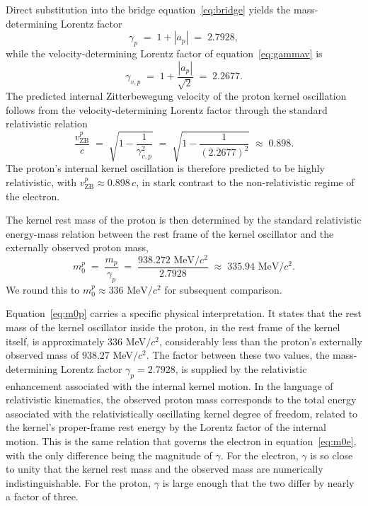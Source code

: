 \documentclass[%
 reprint, amsmath,amssymb, aps, prc, ]{revtex4-2}
\numberwithin{equation}{section}
\newcommand{\vZB}{v_{\text{ZB}}}
\begin{document}
Direct substitution into the bridge equation~\eqref{eq:bridge} yields the mass-determining Lorentz factor
\begin{equation}
\gamma_p \;=\; 1 + |a_p| \;=\; 2.7928,
\label{eq:gammap}
\end{equation}
while the velocity-determining Lorentz factor of equation~\eqref{eq:gammav} is
\begin{equation}
\gamma_{v,p} \;=\; 1 + \frac{|a_p|}{\sqrt{2}} \;=\; 2.2677.
\label{eq:gammavp}
\end{equation}
The predicted internal Zitterbewegung velocity of the proton kernel oscillation follows from the velocity-determining Lorentz factor through the standard relativistic relation
\begin{equation}
\frac{\vZB^p}{c} \;=\; \sqrt{1 - \frac{1}{\gamma_{v,p}^{2}}} \;=\; \sqrt{1 - \frac{1}{(2.2677)^2}} \;\approx\; 0.898.
\label{eq:vZBp}
\end{equation}
The proton's internal kernel oscillation is therefore predicted to be highly relativistic, with $\vZB^p \approx 0.898\,c$, in stark contrast to the non-relativistic regime of the electron.

The kernel rest mass of the proton is then determined by the standard relativistic energy-mass relation between the rest frame of the kernel oscillator and the externally observed proton mass,
\begin{equation}
m_{0}^{p} \;=\; \frac{m_p}{\gamma_p} \;=\; \frac{938.272 \text{ MeV}/c^2}{2.7928} \;\approx\; 335.94 \text{ MeV}/c^2.
\label{eq:m0p}
\end{equation}
We round this to $m_0^p \approx 336 \text{ MeV}/c^2$ for subsequent comparison.

Equation~\eqref{eq:m0p} carries a specific physical interpretation.
It states that the rest mass of the kernel oscillator inside the proton, in the rest frame of the kernel itself, is approximately $336$ MeV$/c^2$, considerably less than the proton's externally observed mass of $938.27$ MeV$/c^2$.
The factor between these two values, the mass-determining Lorentz factor $\gamma_p = 2.7928$, is supplied by the relativistic enhancement associated with the internal kernel motion.
In the language of relativistic kinematics, the observed proton mass corresponds to the total energy associated with the relativistically oscillating kernel degree of freedom, related to the kernel's proper-frame rest energy by the Lorentz factor of the internal motion.
This is the same relation that governs the electron in equation~\eqref{eq:m0e}, with the only difference being the magnitude of $\gamma$.
For the electron, $\gamma$ is so close to unity that the kernel rest mass and the observed mass are numerically indistinguishable.
For the proton, $\gamma$ is large enough that the two differ by nearly a factor of three.
\end{document}
